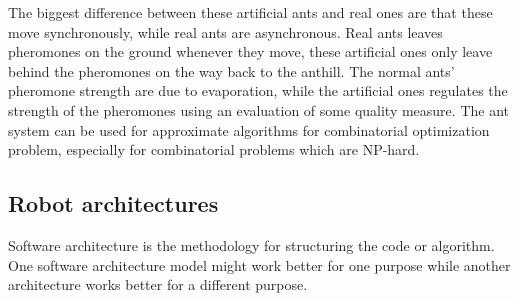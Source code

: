 The biggest difference between these artificial ants and real ones are that these move synchronously, while real ants are asynchronous. Real ants leaves pheromones on the ground whenever they move, these artificial ones only leave behind the pheromones on the way back to the anthill. The normal ants' pheromone strength are due to evaporation, while the artificial ones regulates the strength of the pheromones using an evaluation of some quality measure. The ant system can be used for approximate algorithms for combinatorial optimization problem, especially for combinatorial problems which are NP-hard.

\subsection{Robot architectures}
\label{sec:robotArch}
Software architecture is the methodology for structuring the code or algorithm. One software architecture model might work better for one purpose while another architecture works better for a different purpose. 

